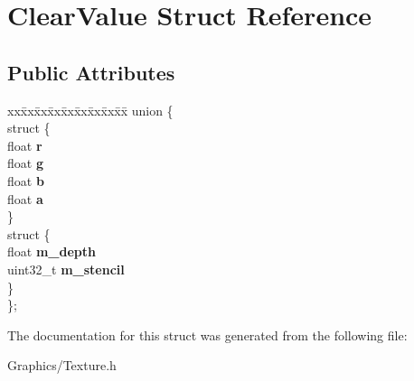 \hypertarget{structClearValue}{}\section{Clear\+Value Struct Reference}
\label{structClearValue}
\subsection*{Public Attributes}
\begin{DoxyCompactItemize}
\item 
\mbox{\label{structClearValue_aa59a944b6e8b81bed2fc7c7948d5f1a6}} 
\begin{tabbing}
xx\=xx\=xx\=xx\=xx\=xx\=xx\=xx\=xx\=\kill
union \{\\
\mbox{\label{unionClearValue_1_1_0D8_a5b4b7eb2d748b46e2fba13a00ee48551}} 
\>struct \{\\
\>\>float {\bfseries r}\\
\>\>float {\bfseries g}\\
\>\>float {\bfseries b}\\
\>\>float {\bfseries a}\\
\>\} \\
\mbox{\label{unionClearValue_1_1_0D8_ad4b76c6f6ccb1842ed29c79046dbe977}} 
\>struct \{\\
\>\>float {\bfseries m\_depth}\\
\>\>uint32\_t {\bfseries m\_stencil}\\
\>\} \\
\}; \\

\end{tabbing}\end{DoxyCompactItemize}


The documentation for this struct was generated from the following file\+:\begin{DoxyCompactItemize}
\item 
Graphics/Texture.\+h\end{DoxyCompactItemize}
